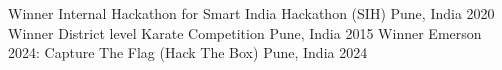 


\begin{cvhonors}

  \cvhonor
    {Winner} %
    {Internal Hackathon for Smart India Hackathon (SIH)} %
    {Pune, India} %
    {2020} %
  \cvhonor
    {Winner} %
    {District level Karate Competition} %
    {Pune, India} %
    {2015} %
  \cvhonor
    {Winner} %
    {Emerson 2024: Capture The Flag (Hack The Box)} %
    {Pune, India} %
    {2024} %
\end{cvhonors}